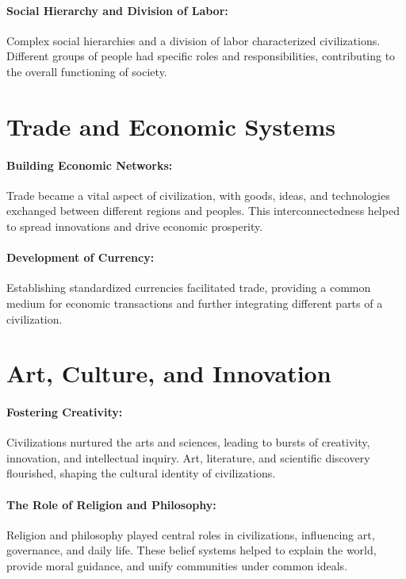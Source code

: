 \documentclass[a4paper,12pt]{book}
\begin{document}
\paragraph{Social Hierarchy and Division of Labor:}
Complex social hierarchies and a division of labor characterized civilizations. Different groups of people had specific roles and responsibilities, contributing to the overall functioning of society.

\section*{Trade and Economic Systems}

\paragraph{Building Economic Networks:}
Trade became a vital aspect of civilization, with goods, ideas, and technologies exchanged between different regions and peoples. This interconnectedness helped to spread innovations and drive economic prosperity.

\paragraph{Development of Currency:}
Establishing standardized currencies facilitated trade, providing a common medium for economic transactions and further integrating different parts of a civilization.

\section*{Art, Culture, and Innovation}

\paragraph{Fostering Creativity:}
Civilizations nurtured the arts and sciences, leading to bursts of creativity, innovation, and intellectual inquiry. Art, literature, and scientific discovery flourished, shaping the cultural identity of civilizations.

\paragraph{The Role of Religion and Philosophy:}
Religion and philosophy played central roles in civilizations, influencing art, governance, and daily life. These belief systems helped to explain the world, provide moral guidance, and unify communities under common ideals.
\end{document}
